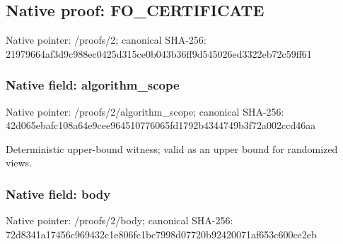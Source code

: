 \documentclass[10pt,a4paper]{article}
\begin{document}
\subsection{Native proof: FO\_\allowbreak{}CERTIFICATE}
Native pointer: /proofs/2; canonical SHA-256: 21979664af3d9c988ec0425d315ce0b043b36ff9d545026ed3322eb72c59ff61

\subsubsection{Native field: algorithm\_\allowbreak{}scope}
Native pointer: /proofs/2/algorithm\_\allowbreak{}scope; canonical SHA-256: 42d065ebafc108a64e9cee964510776065fd1792b4344749b3f72a002ccd46aa

\begingroup\raggedright\sloppy Deterministic upper-bound witness;\allowbreak{} valid as an upper bound for randomized views.\par\endgroup

\subsubsection{Native field: body}
Native pointer: /proofs/2/body; canonical SHA-256: 72d8341a17456c969432c1e806fc1bc7998d07720b92420071af653c600ce2eb
\end{document}
